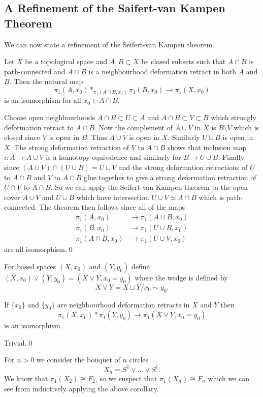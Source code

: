 \documentclass{article}
\begin{document}
\subsection{A Refinement of the Saifert-van Kampen Theorem}
We can now state a refinement of the Seifert-van Kampen theorem.
\begin{theorem}
  Let $ X $ be a topological space and $ A,B\subset X $ be closed subsets such that $ A\cap B $ is path-connected and $ A\cap B $ is a neighbourhood deformation retract in both $ A $ and $ B $. Then the natural map
  \[
	  \pi_1(A,x_0) *_{\pi_1(A\cap B,x_0)} \pi_1(B,x_0)\to \pi_1(X,x_0)
  \]
  is an isomorphism for all $ x_0\in A\cap B $.
\end{theorem}
\pf Choose open neighbourhoods $ A\cap B \subset U \subset A $ and $ A\cap B \subset V \subset B $ which strongly deformation retract to $ A\cap B $. Now the complement of $ A\cup V $ in $ X $ is $ B \setminus V $ which is closed since $ V	$ is open in $ B $. Thus $ A\cup V $ is open in $ X $. Similarly $ U\cup B $ is open in $ X $. The strong deformation retraction of $ V $ to $ A\cap B $ shows that inclusion map $ \iota: A \to A \cup V $ is a homotopy equivalence and similarly for $ B\to U\cup B $. Finally since $ (A\cup V)\cap (U\cup B) = U\cup V $ and the strong deformation retractions of $ U $ to $ A\cap B $ and $ V $ to $ A\cap B $ glue together to give a strong deformation retraction of $ U\cap V $ to $ A\cap B $. So we can apply the Seifert-van Kampen  theorem to the open cover $ A\cup V $ and $ U\cup B $ which have intersection $ U\cup V\simeq A\cap B $ which is path-connected. The theorem then follows since all of the maps
\begin{align*}
	\pi_1(A,x_0) &\to \pi_1(A\cup B,x_0) \\
 \pi_1(B,x_0) &\to \pi_1(U\cup B,x_0) \\
 \pi_1(A\cap B,x_0) & \to \pi_1(U\cup V,x_0)
\end{align*}
are all isomorphism.\qed
\par
For based spaces $ (X,x_0) $ and $ (Y,y_0) $ define $ (X,x_0) \vee (Y,y_0) = (X\vee Y,x_0 = y_0) $ where the wedge is defined by
\[
  X\vee Y = X\sqcup Y/x_0 \sim y_0.
\]
\begin{corollary}
	If $ \{x_0\} $ and $ \{y_0\} $ are neighbourhood deformation retracts in $ X $ and $ Y $ then
	\[
	  \pi_1(X,x_0) * \pi_1(Y,y_0) \to \pi_1(X\vee Y,x_0 = y_0)
	\]
	is an isomorphism.
\end{corollary}
\pf Trivial.\qed
\begin{example}
	For $ n>0 $ we consider the bouquet of $ n $ circles 
	\[
	  X_n = S^1 \vee \dots \vee S^1.
	\]
	We know that $ \pi_1(X_2) \cong F_2 $, so we suspect that $ \pi_1(X_n) \cong F_n $ which we can see from inductively applying the above corollary.
\end{example}
\end{document}

